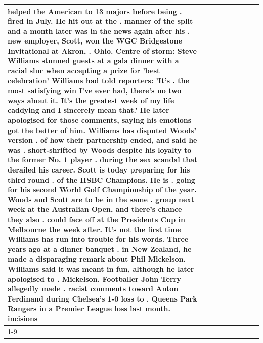 \begin{table}[H]
\begin{tabular}{lllrlllll}
helped the American to 13 majors before being . fired in July. He hit out at the . manner of the split and a month later was in the news again after his . new employer, Scott, won the WGC Bridgestone Invitational at Akron, . Ohio. Centre of storm: Steve Williams stunned guests at a gala dinner with a racial slur when accepting a prize for 'best celebration' Williams had told reporters: 'It's . the most satisfying win I've ever had, there's no two ways about it. It's the greatest week of my life caddying and I sincerely mean that.' He later apologised for those comments, saying his emotions got the better of him. Williams has disputed Woods' version . of how their partnership ended, and said he was . short-shrifted by Woods despite his loyalty to the former No. 1 player . during the sex scandal that derailed his career. Scott is today preparing for his third round . of the HSBC Champions. He is . going for his second World Golf Championship of the year. Woods and Scott are to be in the same . group next week at the Australian Open, and there's chance they also . could face off at the Presidents Cup in Melbourne the week after. It's not the first time Williams has run into trouble for his words. Three years ago at a dinner banquet . in New Zealand, he made a disparaging remark about Phil Mickelson. Williams said it was meant in fun, although he later apologised to . Mickelson. Footballer John Terry allegedly made . racist comments toward Anton Ferdinand during Chelsea's 1-0 loss to . Queens Park Rangers in a Premier League loss last month. incisions \\
\cline{1-9}

\end{tabular}
\end{table}
